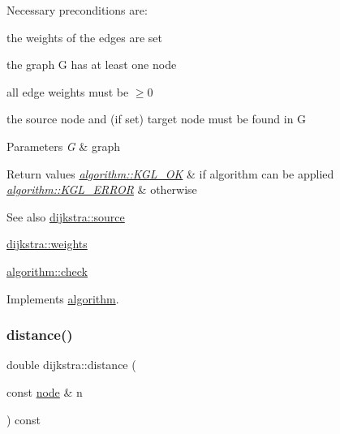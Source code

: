 Necessary preconditions are\+:
\begin{DoxyItemize}
\item the weights of the edges are set
\item the graph {\ttfamily G} has at least one node
\item all edge weights must be $\ge 0$
\item the source node and (if set) target node must be found in {\ttfamily G} 
\end{DoxyItemize}


\begin{DoxyParams}{Parameters}
{\em G} & graph\\
\hline
\end{DoxyParams}

\begin{DoxyRetVals}{Return values}
{\em \mbox{\hyperlink{classalgorithm_af1a0078e153aa99c24f9bdf0d97f6710aae4c1cd7fe8d8cf4b143241a6e7c31cf}{algorithm\+::\+K\+G\+L\+\_\+\+OK}}} & if algorithm can be applied \\
\hline
{\em \mbox{\hyperlink{classalgorithm_af1a0078e153aa99c24f9bdf0d97f6710ae67bf27b2ef31f73e545a7f9f4a69556}{algorithm\+::\+K\+G\+L\+\_\+\+E\+R\+R\+OR}}} & otherwise\\
\hline
\end{DoxyRetVals}
\begin{DoxySeeAlso}{See also}
\mbox{\hyperlink{classdijkstra_a9689f2628f76ddb3747ea18c91bd7041}{dijkstra\+::source}} 

\mbox{\hyperlink{classdijkstra_a92f4394b757f6ffcb372535114a6cbf6}{dijkstra\+::weights}} 

\mbox{\hyperlink{classalgorithm_a76361fb03ad1cf643affc51821e43bed}{algorithm\+::check}} 
\end{DoxySeeAlso}


Implements \mbox{\hyperlink{classalgorithm_a76361fb03ad1cf643affc51821e43bed}{algorithm}}.

\mbox{\label{classdijkstra_ae350a266dd47091d7f620a7328619426}} 
\subsubsection{\texorpdfstring{distance()}{distance()}}
{\footnotesize\ttfamily double dijkstra\+::distance (\begin{DoxyParamCaption}\item[{const \mbox{\hyperlink{classnode}{node}} \&}]{n }\end{DoxyParamCaption}) const}



